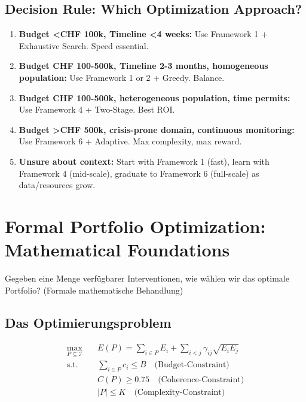 \subsection{Decision Rule: Which Optimization Approach?}

\begin{enumerate}
\item \textbf{Budget <CHF 100k, Timeline <4 weeks:} Use Framework 1 + Exhaustive Search. Speed essential.
\item \textbf{Budget CHF 100-500k, Timeline 2-3 months, homogeneous population:} Use Framework 1 or 2 + Greedy. Balance.
\item \textbf{Budget CHF 100-500k, heterogeneous population, time permits:} Use Framework 4 + Two-Stage. Best ROI.
\item \textbf{Budget >CHF 500k, crisis-prone domain, continuous monitoring:} Use Framework 6 + Adaptive. Max complexity, max reward.
\item \textbf{Unsure about context:} Start with Framework 1 (fast), learn with Framework 4 (mid-scale), graduate to Framework 6 (full-scale) as data/resources grow.
\end{enumerate}

\section{Formal Portfolio Optimization: Mathematical Foundations}
\label{sec:20-formal-optimization}

Gegeben eine Menge verfügbarer Interventionen, wie wählen wir das optimale Portfolio? (Formale mathematische Behandlung)

\subsection{Das Optimierungsproblem}

\begin{definition}
\label{def:20-optimization}
\begin{align}
\max_{P \subseteq \mathcal{I}} \quad & E(P) = \sum_{i \in P} E_i + \sum_{i < j} \gamma_{ij} \sqrt{E_i E_j} \label{eq:20-objective}\\
\text{s.t.} \quad & \sum_{i \in P} c_i \leq B \quad \text{(Budget-Constraint)} \label{eq:20-budget}\\
& C(P) \geq 0.75 \quad \text{(Coherence-Constraint)} \label{eq:20-coherence-constraint}\\
& |P| \leq K \quad \text{(Complexity-Constraint)} \label{eq:20-complexity}
\end{align}
\end{definition}

